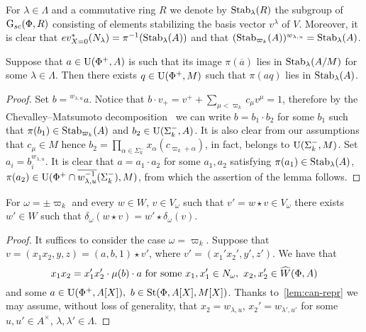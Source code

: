 \begin{cor}
For $\lambda \in \Lambda$ and a commutative ring $R$ we denote by $\operatorname{Stab}_{\lambda}(R)$ the subgroup of $\operatorname{G}_{sc}(\Phi, R)$
 consisting of elements stabilizing the basis vector $v^\lambda$ of $V$.
Moreover, it is clear that $ev_{X=0}^*(N_\lambda) = \pi^{-1}(\operatorname{Stab}_\lambda(A))$ and that
 $(\operatorname{Stab}_{\varpi_k}(A))^{w_{\lambda, u}} = \operatorname{Stab}_\lambda(A)$.
\begin{lemma} \label{lem:q}
Suppose that $a \in \operatorname{U}(\Phi^+, A)$ is such that its image $\pi(\overline{a})$ lies in $\operatorname{Stab}_{\lambda}(A/M)$ for some $\lambda \in \Lambda$.
Then there exists $q \in \operatorname{U}(\Phi^+, M)$ such that $\pi(aq)$ lies in $\operatorname{Stab}_{\lambda}(A)$.
\end{lemma}
\begin{proof}
    Set $b = {}^{w_{\lambda, u}} a$.
    Notice that $b \cdot v_+ = v^+ + \sum_{\mu < \varpi_k} c_\mu v^\mu = 1$, therefore by the Chevalley--Matsumoto decomposition~\cite[Theorem~1.3]{St78} we can write
     $b = b_1 \cdot b_2$ for some $b_1$ such that $\pi(b_1) \in \operatorname{Stab}_{\varpi_k}(A)$ and $b_2 \in \operatorname{U}(\Sigma_k^-, A)$.
    It is also clear from our assumptions that $c_\mu \in M$ hence $b_2 = \prod_{\alpha \in \Sigma_k^-}x_{\alpha}(c_{\varpi_k + \alpha})$, in fact, belongs to $\operatorname{U}(\Sigma_k^-, M)$.
    Set $a_i = b_i^{w_{\lambda, u}}$.
    It is clear that $a = a_1 \cdot a_2$  for some $a_1, a_2$ satisfying $\pi(a_1) \in \operatorname{Stab}_\lambda(A)$, $\pi(a_2) \in \operatorname{U}(\Phi^+ \cap \overline{w_{\lambda, u}^{-1}}(\Sigma_k^-), M)$,
     from which the assertion of the lemma follows.
\end{proof}

\begin{prop} \label{prop:v-correctness2}
 For $\omega = \pm \varpi_k$ and every $w \in W$, $v \in V_\omega$ such that $v' = w \star v \in V_\omega$ there exists $w' \in W$ such that
  $\delta_\omega(w \star v) = w' \star \delta_\omega(v)$.
\end{prop}
\begin{proof}
 It suffices to consider the case $\omega = \varpi_k$.
 Suppose that $v = (x_1 x_2, y, z) = (a, b, 1) \star v'$, where $v' = (x_1' x_2', y', z')$.
 We have that
 \begin{equation}\label{eq:x-xprime} x_1 x_2 = x_1' x_2' \cdot \mu(b) \cdot a  \text{ for some }x_1, x_1' \in N_\omega,\ x_2, x_2' \in \widehat{W}(\Phi, A) \end{equation}
 and some $a \in \operatorname{U}(\Phi^+, A[X]),\ b \in \operatorname{St}(\Phi, A[X], M[X])$.
 Thanks to~\cref{lem:can-repr} we may assume, without loss of generality, that $x_2 = w_{\lambda, u}$, $x_2' = w_{\lambda', u'}$
 for some $u, u' \in A^\times$, $\lambda, \lambda' \in \Lambda$.


\end{proof}
\end{cor}

